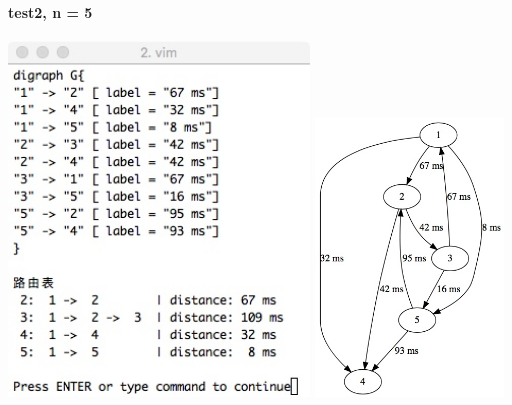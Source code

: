 \documentclass{article}
\begin{document}
		\paragraph{test2, n = 5}
			\begin{center}
			\includegraphics[width = 8cm]{data5.jpeg}
			\includegraphics[width = 5cm]{data5viz.jpeg}
			\end{center}
			\clearpage
\end{document}
